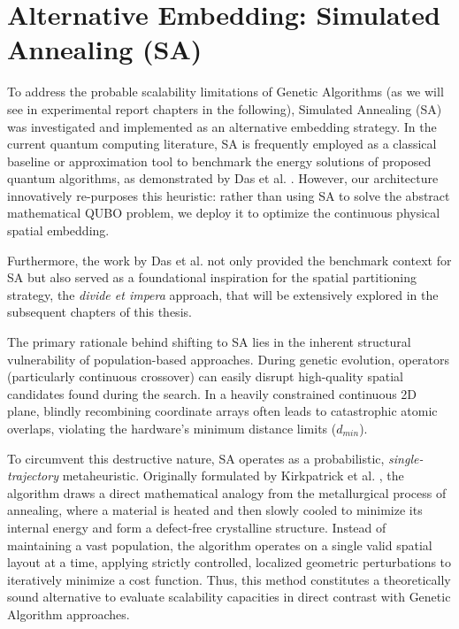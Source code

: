 \section{Alternative Embedding: Simulated Annealing (SA)}
\label{sec:sa_theory}

To address the probable scalability limitations of Genetic Algorithms (as we will see in experimental report chapters in the following), Simulated Annealing (SA) was investigated and implemented as an alternative embedding strategy. In the current quantum computing literature, SA is frequently employed as a classical baseline or approximation tool to benchmark the energy solutions of proposed quantum algorithms, as demonstrated by Das et al. \cite{das2025grid}. However, our architecture innovatively re-purposes this heuristic: rather than using SA to solve the abstract mathematical QUBO problem, we deploy it to optimize the continuous physical spatial embedding.

Furthermore, the work by Das et al. \cite{das2025grid} not only provided the benchmark context for SA but also served as a foundational inspiration for the spatial partitioning strategy, the \textit{divide et impera} approach, that will be extensively explored in the subsequent chapters of this thesis.

The primary rationale behind shifting to SA lies in the inherent structural vulnerability of population-based approaches. During genetic evolution, operators (particularly continuous crossover) can easily disrupt high-quality spatial candidates found during the search. In a heavily constrained continuous 2D plane, blindly recombining coordinate arrays often leads to catastrophic atomic overlaps, violating the hardware's minimum distance limits ($d_{min}$). 

To circumvent this destructive nature, SA operates as a probabilistic, \textit{single-trajectory} metaheuristic. Originally formulated by Kirkpatrick et al. \cite{kirkpatrick1983optimization}, the algorithm draws a direct mathematical analogy from the metallurgical process of annealing, where a material is heated and then slowly cooled to minimize its internal energy and form a defect-free crystalline structure. Instead of maintaining a vast population, the algorithm operates on a single valid spatial layout at a time, applying strictly controlled, localized geometric perturbations to iteratively minimize a cost function. Thus, this method constitutes a theoretically sound alternative to evaluate scalability capacities in direct contrast with Genetic Algorithm approaches.

